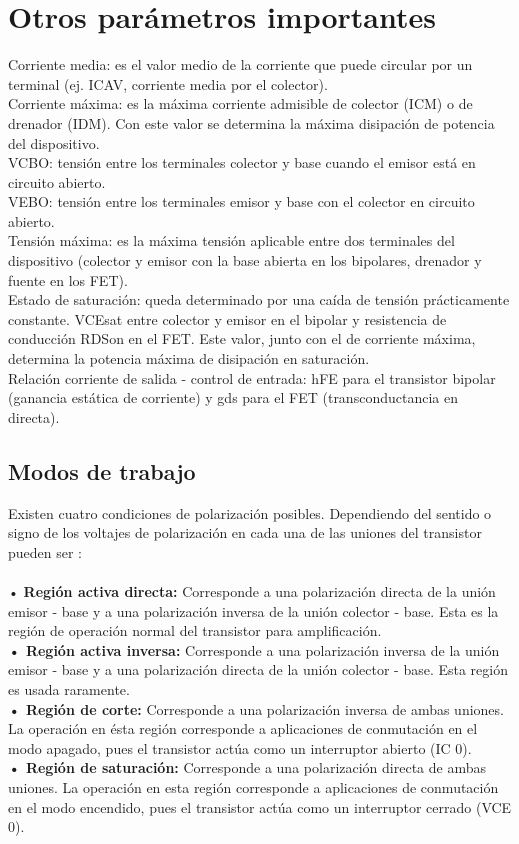 \documentclass[12pt,a4paper]{article}
\begin{document}
\section{Otros parámetros importantes}
Corriente media: es el valor medio de la corriente que puede circular por un terminal (ej. I{\tiny CAV}, corriente media por el colector).\\
Corriente máxima: es la máxima corriente admisible de colector (I{\tiny CM}) o de drenador (I{\tiny DM}). Con este valor se determina la máxima disipación de potencia del dispositivo.\\
V{\tiny CBO}: tensión entre los terminales colector y base cuando el emisor está en circuito abierto.\\
V{\tiny EBO}: tensión entre los terminales emisor y base con el colector en circuito abierto.\\
Tensión máxima: es la máxima tensión aplicable entre dos terminales del dispositivo (colector y emisor con la base abierta en los bipolares, drenador y fuente en los FET).\\
Estado de saturación: queda determinado por una caída de tensión prácticamente constante. V{\tiny CEsat} entre colector y emisor en el bipolar y resistencia de conducción R{\tiny DSon }en el FET. Este valor, junto con el de corriente máxima, determina la potencia máxima de disipación en saturación.\\
Relación corriente de salida - control de entrada: h{\tiny FE }para el transistor bipolar (ganancia estática de corriente) y g{\tiny ds} para el FET (transconductancia en directa).\\
\subsection{Modos de trabajo}
Existen cuatro condiciones de polarización posibles. Dependiendo del sentido o signo de los voltajes de polarización en cada una de las uniones del transistor pueden ser :\\
$$ $$
\\
    • \textbf{Región activa directa:} Corresponde a una polarización directa de la unión emisor - base y a una polarización inversa de la unión colector - base. Esta es la región de operación normal del transistor para amplificación.
    \\
    \textbf{• Región activa inversa:} Corresponde a una polarización inversa de la unión emisor - base y a una polarización directa de la unión colector - base. Esta región es usada raramente.
 \\
   \textbf{ • Región de corte:} Corresponde a una polarización inversa de ambas uniones. La operación en ésta región corresponde a aplicaciones de conmutación en el modo apagado, pues el transistor actúa como un interruptor abierto (IC 0).
 \\
    \textbf{• Región de saturación:} Corresponde a una polarización directa de ambas uniones. La operación en esta región corresponde a aplicaciones de conmutación en el modo encendido, pues el transistor actúa como un interruptor cerrado (VCE 0).\\
\end{document}
